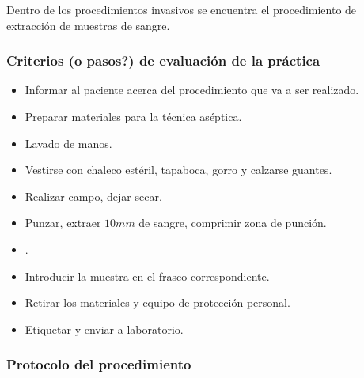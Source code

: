 Dentro de los procedimientos invasivos se encuentra el procedimiento de
extracción de muestras de sangre.

\subsubsection{Criterios (o pasos?) de evaluación de la práctica}
\begin{itemize}
\item Informar al paciente acerca del procedimiento que va a ser
    realizado.
\item Preparar materiales para la técnica aséptica.
\item Lavado de manos.
\item Vestirse con chaleco estéril, tapaboca, gorro y calzarse
    guantes.
\item Realizar campo, dejar secar.
\item Punzar, extraer $10mm$ de sangre, comprimir zona de punción.
\item {}.
\item Introducir la muestra en el frasco correspondiente.
\item Retirar los materiales y equipo de protección personal.
\item Etiquetar y enviar a laboratorio.
\end{itemize}

\subsubsection{Protocolo del procedimiento}
\label{sec:hemocultivo_protocolo}

